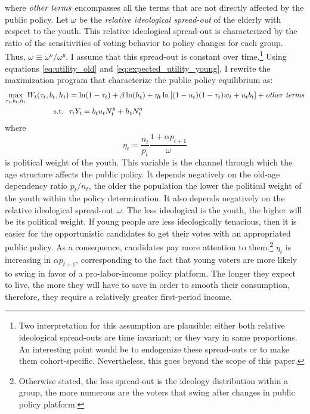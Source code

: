 where $\text{\textit{other~terms}}$ encompasses all the terms that are not directly affected by the public policy. Let $\omega$ be the \textit{relative ideological spread-out} of the elderly with respect to the youth. This relative ideological spread-out is characterized by the ratio of the sensitivities of voting behavior to policy changes for each group. Thus, $\omega \equiv \omega^o/\omega^y$. I assume that this spread-out is constant over time.\footnote{Two interpretation for this assumption are plausible: either both relative ideological spread-outs are time invariant; or they vary in same proportions. An interesting point would be to endogenize these spread-outs or to make them cohort-specific. Nevertheless, this goes beyond the scope of this paper.} Using equations \eqref{eq:utility_old} and \eqref{eq:expected_utility_young}, I rewrite the maximization program that characterize the public policy equilibrium as:
	\begin{align*}
		\max_{\tau_t, b_t, h_t} W_t(\tau_t, b_t, h_t) &= \ln(1-\tau_t) +\beta \ln(h_t) + \eta_t \ln\left[(1-u_t)(1-\tau_t)w_t + u_t b_t\right] + \text{\textit{other~terms}} \\
		\text{s.t.} ~~ &\tau_t Y_t = b_t u_t N^y_t + h_t N^o_t
	\end{align*}
where 
\begin{equation}\label{eq:eta}
	\eta_t = \frac{n_t}{p_t}\frac{1+\alpha p_{t+1}}{\omega}
\end{equation}
is political weight of the youth. This variable is the channel through which the age structure affects the public policy. It depends negatively on the old-age dependency ratio $p_t/n_t$, the older the population the lower the political weight of the youth within the policy determination. It also depends negatively on the relative ideological spread-out $\omega$. The less ideological is the youth, the higher will be its political weight. If young people are less ideologically tenacious, then it is easier for the opportunistic candidates to get their votes with an appropriated public policy. As a consequence, candidates pay more attention to them.\footnote{Otherwise stated, the less spread-out is the ideology distribution within a group, the more numerous are the voters that swing after changes in public policy platform.} $\eta_t$ is increasing in $\alpha p_{t+1}$, corresponding to the fact that young voters are more likely to swing in favor of a pro-labor-income policy platform. The longer they expect to live, the more they will have to save in order to smooth their consumption, therefore, they require a relatively greater first-period income.

